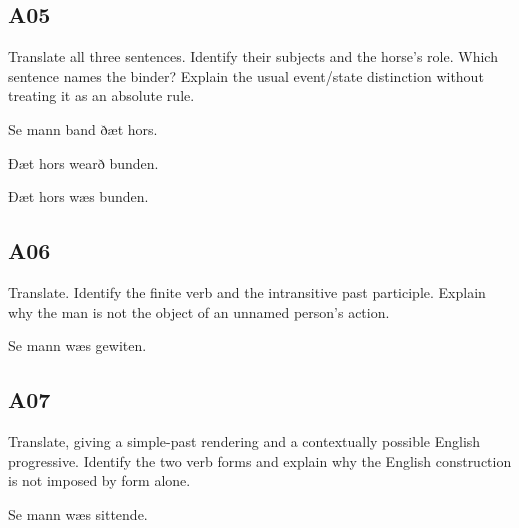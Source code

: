 \subsection*{A05}

\par\begin{minipage}{\linewidth}\raggedright
Translate all three sentences. Identify their subjects and the horse’s role. Which sentence names the binder? Explain the usual event/\allowbreak{}state distinction without treating it as an absolute rule.

Se mann band ðæt hors.

Ðæt hors wearð bunden.

Ðæt hors wæs bunden.

\end{minipage}\par\addvspace{4pt}

\subsection*{A06}

\par\begin{minipage}{\linewidth}\raggedright
Translate. Identify the finite verb and the intransitive past participle. Explain why the man is not the object of an unnamed person’s action.

Se mann wæs gewiten.

\end{minipage}\par\addvspace{4pt}

\subsection*{A07}

\par\begin{minipage}{\linewidth}\raggedright
Translate, giving a simple-past rendering and a contextually possible English progressive. Identify the two verb forms and explain why the English construction is not imposed by form alone.

Se mann wæs sittende.

\end{minipage}\par\addvspace{4pt}

